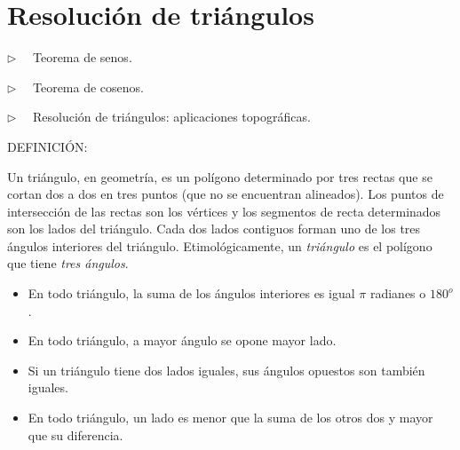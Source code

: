 \chapter{Resolución de triángulos}



\vspace{10mm}


\begin{adjustwidth}{40pt}{40pt}
\begin{cuadro-gris}

	\begin{multicols}{2}
	$\triangleright \quad$   Teorema de senos.
	
	$\triangleright \quad$   Teorema de cosenos.
	
	$\triangleright \quad$   Resolución de triángulos: aplicaciones topográficas.
	
	
	\end{multicols}
	
\end{cuadro-gris}
\end{adjustwidth}

\vspace{15mm}
DEFINICIÓN:

Un triángulo, en  geometría, es un polígono determinado por tres rectas que se cortan dos a dos en tres puntos (que no se encuentran alineados). Los puntos de intersección de las rectas son los vértices y los segmentos de recta determinados son los lados del triángulo. Cada dos lados contiguos forman uno de los tres ángulos interiores del triángulo.
Etimológicamente,  un \emph{triángulo}  es el polígono que tiene \emph{tres ángulos}.


\begin{itemize}
\item En todo  triángulo, la suma de los ángulos interiores es igual $\pi$ radianes o $180^o$.
\item En todo  triángulo, a mayor ángulo se opone mayor lado.
\item Si un  triángulo tiene dos lados iguales, sus ángulos opuestos son también iguales.
\item En todo  triángulo, un lado es menor que la suma de los otros dos y mayor que su diferencia.
\end{itemize}

